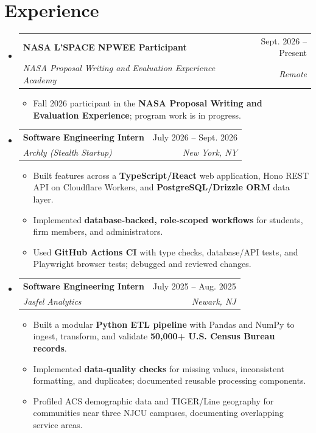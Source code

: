 \documentclass[letterpaper,10pt]{article}
\makeatletter
\newcommand{\resumeItem}[1]{\item\small{#1}}
\newcommand{\resumeSubheading}[4]{
  \vspace{1pt}\item
  \begin{tabular*}{0.97\textwidth}[t]{l@{\extracolsep{\fill}}r}
    \textbf{#1} & #2 \\
    \textit{\small #3} & \textit{\small #4} \\
  \end{tabular*}\vspace{-3pt}
}
\newcommand{\resumeSubHeadingListStart}{\begin{itemize}[leftmargin=0.15in,label={},itemsep=0pt,topsep=0pt]}
\newcommand{\resumeSubHeadingListEnd}{\end{itemize}}
\newcommand{\resumeItemListStart}{\begin{itemize}[leftmargin=0.15in,label=\textbullet,itemsep=-2pt,topsep=0pt]}
\newcommand{\resumeItemListEnd}{\end{itemize}\vspace{0pt}}
\makeatother
\begin{document}
\section{Experience}
\resumeSubHeadingListStart
  \resumeSubheading{NASA L'SPACE NPWEE Participant}{Sept. 2026 -- Present}
    {NASA Proposal Writing and Evaluation Experience Academy}{Remote}
    \resumeItemListStart
      \resumeItem{Fall 2026 participant in the \textbf{NASA Proposal Writing and Evaluation Experience}; program work is in progress.}
    \resumeItemListEnd
  \resumeSubheading{Software Engineering Intern}{July 2026 -- Sept. 2026}
    {Archly (Stealth Startup)}{New York, NY}
    \resumeItemListStart
      \resumeItem{Built features across a \textbf{TypeScript/React} web application, Hono REST API on Cloudflare Workers, and \textbf{PostgreSQL/Drizzle ORM} data layer.}
      \resumeItem{Implemented \textbf{database-backed, role-scoped workflows} for students, firm members, and administrators.}
      \resumeItem{Used \textbf{GitHub Actions CI} with type checks, database/API tests, and Playwright browser tests; debugged and reviewed changes.}
    \resumeItemListEnd
  \resumeSubheading{Software Engineering Intern}{July 2025 -- Aug. 2025}
    {Jasfel Analytics}{Newark, NJ}
    \resumeItemListStart
      \resumeItem{Built a modular \textbf{Python ETL pipeline} with Pandas and NumPy to ingest, transform, and validate \textbf{50,000+ U.S. Census Bureau records}.}
      \resumeItem{Implemented \textbf{data-quality checks} for missing values, inconsistent formatting, and duplicates; documented reusable processing components.}
      \resumeItem{Profiled ACS demographic data and TIGER/Line geography for communities near three NJCU campuses, documenting overlapping service areas.}
    \resumeItemListEnd
\resumeSubHeadingListEnd
\end{document}
